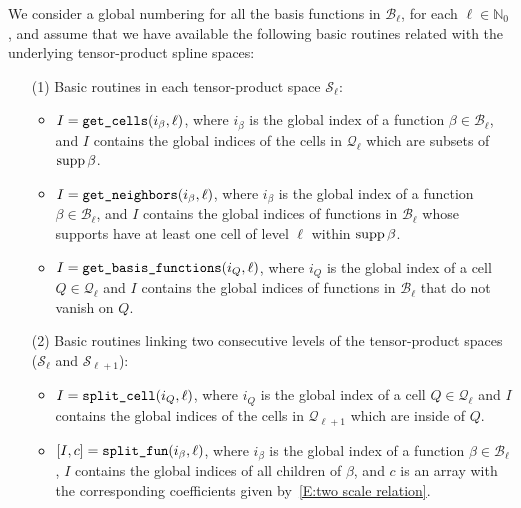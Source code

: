 \documentclass[a4paper]{siamltex1213}
\newcommand\NN{\mathbb N}
\newcommand\BB{\mathcal B}
\newcommand\QQ{\mathcal Q}
\newcommand\VV{\mathcal S}
\begin{document}
We consider a global numbering for all the basis functions in $\BB_\ell$, for each $\ell \in\NN_0$, and assume that we have available the following basic routines related with the underlying tensor-product spline spaces:
\begin{enumerate}
 \item[(1)] Basic routines in each tensor-product space $\VV_\ell$:
\begin{itemize}
 \item $I = \verb+get_cells+ (i_\beta,\ell)$, where $i_\beta$ is the global 
index of a function $\beta\in\BB_\ell$, and $I$ contains the global indices 
of the cells in $\QQ_{\ell}$ which are subsets of $\supp\beta$.
\item $I = \verb+get_neighbors+ (i_\beta,\ell)$, where $i_\beta$ is the global 
index of a function $\beta\in\BB_\ell$, and $I$ contains the global indices 
of functions in $\BB_{\ell}$ whose supports have at least one cell of level $\ell$ within $\supp\beta$.
\item $I = \verb+get_basis_functions+ (i_Q,\ell)$, where $i_Q$ is the global index of a cell $Q\in\QQ_\ell$ and $I$ contains the global indices 
of functions in $\BB_{\ell}$ that do not vanish on $Q$.
\end{itemize}
\item[(2)] Basic routines linking two consecutive levels of the tensor-product spaces ($\VV_\ell$ and $\VV_{\ell+1}$):
\begin{itemize}
\item $I = \verb+split_cell+ (i_Q,\ell)$, where $i_Q$ is the global index of a cell $Q\in\QQ_\ell$ and $I$ contains the global indices 
of the cells in $\QQ_{\ell+1}$ which are inside of $Q$.
\item $[I,c] = \verb+split_fun+ (i_\beta,\ell)$, where $i_\beta$ is the global 
index of a function $\beta\in\BB_\ell$, $I$ contains the global indices of all children of $\beta$, and $c$ 
is an array with the corresponding coefficients given by~\eqref{E:two scale relation}. 
\end{itemize}
\end{enumerate}
\end{document}
